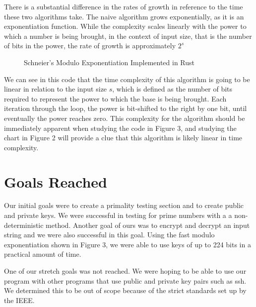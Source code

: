 \documentclass[12pt,technote]{IEEEtran}
\begin{document}
\par There is a substantial difference in the rates of growth in reference to
the time these two algorithms take. The naive algorithm grows exponentially, as
it is an exponentiation function. While the complexity scales linearly with the
power to which a number is being brought, in the context of input size, that is 
the number of bits in the power, the rate of growth is approximately $2^s$
\begin{figure}
	\begin{center}
		
		\caption{Schneier's Modulo Exponentiation Implemented in Rust\cite{sonsec}}
	\end{center}
\end{figure}
\par We can see in this code that the time complexity of this algorithm is going
to be linear in relation to the input size $s$, which is defined as the number
of bits required to represent the power to which the base is being brought. Each
iteration through the loop, the power is bit-shifted to the right by one bit,
until eventually the power reaches zero. This complexity for the algorithm
should be immediately apparent when studying the code in Figure 3, and studying
the chart in Figure 2 will provide a clue that this algorithm is likely linear
in time complexity.
\section{Goals Reached}
Our initial goals were to create a primality testing section and to create 
public and private keys. We were successful in testing for prime numbers with a 
a non-deterministic method. Another goal of ours was to encrypt and decrypt an 
input string and we were also successful in this goal. Using the fast modulo
exponentiation shown in Figure 3, we were able to use keys of up to 224 bits in
a practical amount of time.
\par One of our stretch goals was not reached. We were hoping to be able to use 
our program with other programs that use public and private key pairs such as 
ssh. We determined this to be out of scope because of the strict standards set 
up by the IEEE. 
\end{document}
